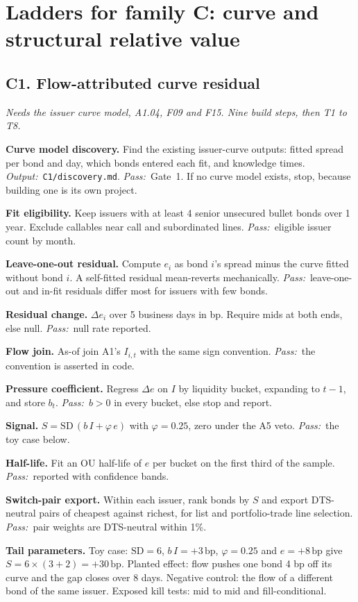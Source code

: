 \documentclass[11pt,letterpaper]{article}
\makeatletter
\newcommand{\code}[1]{\texttt{#1}}
\newcommand{\bp}{\,\mathrm{bp}}
\newcommand{\SD}{\mathrm{SD}}             %
\newcommand*{\twodigit}[1]{\expandafter\@twodigit\csname c@#1\endcsname}
\newcommand*{\@twodigit}[1]{\ifnum#1<10 0\fi\number#1}
\newcommand{\stepname}[1]{\textbf{#1.}}
\newcommand{\Out}{\textit{Output:}~}
\newcommand{\Pass}{\textit{Pass:}~}
\makeatother
\begin{document}
\section{Ladders for family C: curve and structural relative value}
\label{sec:laddersC}

\subsection{C1. Flow-attributed curve residual}
\emph{Needs the issuer curve model, A1.04, F09 and F15. Nine build steps, then T1 to T8.}
\begin{ladder}[label=\textbf{C1.\twodigit*}]
\item \stepname{Curve model discovery} Find the existing issuer-curve outputs: fitted spread per bond and day, which bonds entered each fit, and knowledge times. \Out \code{C1/discovery.md}. \Pass Gate~1. If no curve model exists, stop, because building one is its own project.
\item \stepname{Fit eligibility} Keep issuers with at least 4 senior unsecured bullet bonds over 1 year. Exclude callables near call and subordinated lines. \Pass eligible issuer count by month.
\item \stepname{Leave-one-out residual} Compute $e_i$ as bond $i$'s spread minus the curve fitted without bond $i$. A self-fitted residual mean-reverts mechanically. \Pass leave-one-out and in-fit residuals differ most for issuers with few bonds.
\item \stepname{Residual change} $\Delta e_i$ over 5 business days in bp. Require mids at both ends, else null. \Pass null rate reported.
\item \stepname{Flow join} As-of join A1's $I_{i,t}$ with the same sign convention. \Pass the convention is asserted in code.
\item \stepname{Pressure coefficient} Regress $\Delta e$ on $I$ by liquidity bucket, expanding to $t-1$, and store $b_t$. \Pass $b>0$ in every bucket, else stop and report.
\item \stepname{Signal} $S=\SD\,(b\,I+\varphi\,e)$ with $\varphi=0.25$, zero under the A5 veto. \Pass the toy case below.
\item \stepname{Half-life} Fit an OU half-life of $e$ per bucket on the first third of the sample. \Pass reported with confidence bands.
\item \stepname{Switch-pair export} Within each issuer, rank bonds by $S$ and export DTS-neutral pairs of cheapest against richest, for list and portfolio-trade line selection. \Pass pair weights are DTS-neutral within 1\%.
\end{ladder}
\textbf{Tail parameters.} Toy case: $\SD=6$, $b\,I=+3\bp$, $\varphi=0.25$ and $e=+8\bp$ give $S=6\times(3+2)=+30\bp$. Planted effect: flow pushes one bond 4 bp off its curve and the gap closes over 8 days. Negative control: the flow of a different bond of the same issuer. Exposed kill tests: mid to mid and fill-conditional.
\end{document}
